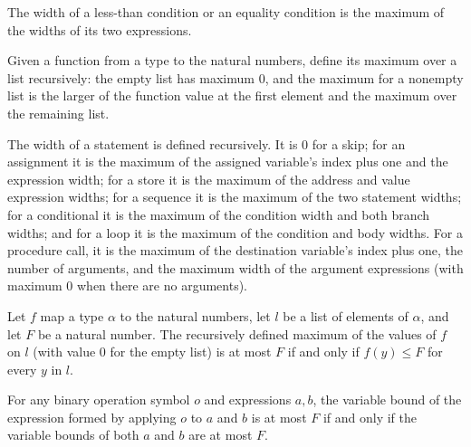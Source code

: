 \begin{definition}
\label{Light.Cond.width}
\leanok
{}
The width of a less-than condition or an equality condition is the maximum of the widths
of its two expressions.
\end{definition}

\begin{definition}
\label{Light.maxOf}
\leanok
Given a function from a type to the natural numbers, define its maximum over a list
recursively: the empty list has maximum $0$, and the maximum for a nonempty list is the
larger of the function value at the first element and the maximum over the remaining
list.
\end{definition}

\begin{definition}
\label{Light.Stmt.width}
\leanok
{}
The width of a statement is defined recursively. It is $0$ for a skip; for an assignment
it is the maximum of the assigned variable's index plus one and the expression width;
for a store it is the maximum of the address and value expression widths; for a sequence
it is the maximum of the two statement widths; for a conditional it is the maximum of
the condition width and both branch widths; and for a loop it is the maximum of the
condition and body widths. For a procedure call, it is the maximum of the destination
variable's index plus one, the number of arguments, and the maximum width of the
argument expressions (with maximum $0$ when there are no arguments).
\end{definition}

\begin{theorem}
\label{Light.maxOf_le_iff}
\leanok
{}
Let $f$ map a type $\alpha$ to the natural numbers, let $l$ be a list of elements of
$\alpha$, and let $F$ be a natural number. The recursively defined maximum of the values
of $f$ on $l$ (with value $0$ for the empty list) is at most $F$ if and only if $f(y)\le
F$ for every $y$ in $l$.
\end{theorem}

\begin{theorem}
\label{Light.Expr.vars_op_le_iff}
\leanok
{}
For any binary operation symbol $o$ and expressions $a,b$, the variable bound of the
expression formed by applying $o$ to $a$ and $b$ is at most $F$ if and only if the
variable bounds of both $a$ and $b$ are at most $F$.
\end{theorem}

